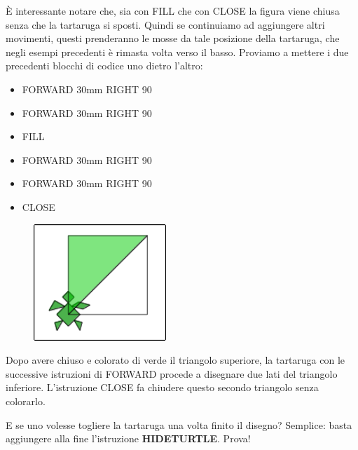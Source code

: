 \vskip 1cm

È interessante notare che, sia con FILL che con CLOSE la figura viene chiusa senza che la tartaruga  si sposti. Quindi se continuiamo ad aggiungere altri movimenti, questi prenderanno le mosse  da tale posizione della tartaruga, che negli esempi precedenti è rimasta volta verso il basso. Proviamo a mettere i due precedenti blocchi di codice uno dietro l'altro:

\vskip 1cm

\begin{scriptsize}
\begin{minipage}{0.40\textwidth}
\begin{itemize}[itemsep=-3pt,parsep=2pt]
\item[] FORWARD 30mm RIGHT 90
\item[] FORWARD 30mm RIGHT 90
\item[] FILL                  
\item[] FORWARD 30mm RIGHT 90
\item[] FORWARD 30mm RIGHT 90
\item[] CLOSE                  
\end{itemize}
\end{minipage}
\end{scriptsize}
\begin{minipage}{0.4\textwidth}
\begin{figure}[H]
   \includegraphics[width=5.0cm,trim=4 4 8 4,clip]{./images/disegnare/disegnare-15.png}
   \label{dis-15}
\end{figure}
\end{minipage} \hfill

\vskip 1cm

Dopo avere chiuso e colorato di verde il triangolo superiore, la tartaruga con le successive istruzioni di FORWARD procede a disegnare due lati del triangolo inferiore. L'istruzione CLOSE fa chiudere questo secondo triangolo senza colorarlo. 

E se uno volesse togliere la tartaruga una volta finito il disegno? Semplice: basta aggiungere alla fine l'istruzione \textbf{HIDETURTLE}. Prova! 

